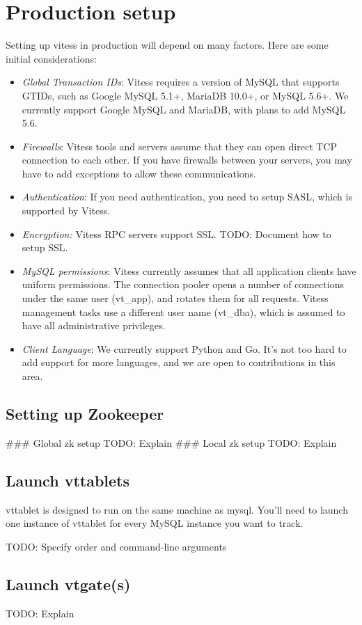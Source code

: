\section{Production setup}\hypertarget{production-setup}{}\label{production-setup}

Setting up vitess in production will depend on many factors.
Here are some initial considerations:
\begin{itemize}
\item \emph{Global Transaction IDs}: Vitess requires a version of MySQL that supports GTIDs, such as Google MySQL 5.1+, MariaDB 10.0+, or MySQL 5.6+. We currently support Google MySQL and MariaDB, with plans to add MySQL 5.6.
\item \emph{Firewalls}: Vitess tools and servers assume that they can open direct TCP connection to each other. If you have firewalls between your servers, you may have to add exceptions to allow these communications.
\item \emph{Authentication}: If you need authentication, you need to setup SASL, which is supported by Vitess.
\item \emph{Encryption:} Vitess RPC servers support SSL. TODO: Document how to setup SSL.
\item \emph{MySQL permissions}: Vitess currently assumes that all
application clients have uniform permissions.
The connection pooler opens a number of connections under
the same user (vt\_app), and rotates them for all requests.
Vitess management tasks use a different user name (vt\_dba),
which is assumed to have all administrative privileges.
\item \emph{Client Language}: We currently support
      Python and Go.
It's not too hard to add support for more languages,
and we are open to contributions in this area.
\end{itemize}

\subsection{Setting up Zookeeper}\hypertarget{setting-up-zookeeper}{}\label{setting-up-zookeeper}

\#\#\# Global zk setup
TODO: Explain
\#\#\# Local zk setup
TODO: Explain

\subsection{Launch vttablets}\hypertarget{launch-vttablets}{}\label{launch-vttablets}

vttablet is designed to run on the same machine as mysql.
You'll need to launch one instance of vttablet for every MySQL instance you want to track.

TODO: Specify order and command-line arguments

\subsection{Launch vtgate(s)}\hypertarget{launch-vtgates}{}\label{launch-vtgates}

TODO: Explain

